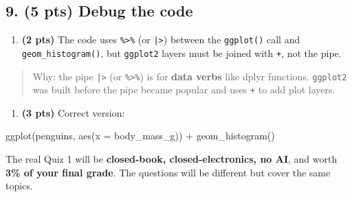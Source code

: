 \documentclass[
  11pt,
  letterpaper,
  DIV=11,
  numbers=noendperiod]{scrartcl}
\newenvironment{Shaded}{\begin{snugshade}}{\end{snugshade}}
\newcommand{\AttributeTok}[1]{\textcolor[rgb]{0.40,0.45,0.13}{#1}}
\newcommand{\FunctionTok}[1]{\textcolor[rgb]{0.28,0.35,0.67}{#1}}
\newcommand{\NormalTok}[1]{\textcolor[rgb]{0.00,0.23,0.31}{#1}}
\newcommand{\SpecialCharTok}[1]{\textcolor[rgb]{0.37,0.37,0.37}{#1}}
\providecommand{\tightlist}{%
  \setlength{\itemsep}{0pt}\setlength{\parskip}{0pt}}
\begin{document}
\hrulefill

\subsection{9. (5 pts) Debug the code}

\begin{enumerate}
\def\labelenumi{(\alph{enumi})}
\tightlist
\item \textbf{(2 pts)} The code uses \texttt{\%\textgreater{}\%} (or \texttt{|\textgreater{}}) between the \texttt{ggplot()} call and \texttt{geom\_histogram()}, but \texttt{ggplot2} layers must be joined with \texttt{+}, not the pipe.
\end{enumerate}

\begin{quote}
Why: the pipe \texttt{|\textgreater{}} (or \texttt{\%\textgreater{}\%}) is for \textbf{data verbs} like dplyr functions. \texttt{ggplot2} was built before the pipe became popular and uses \texttt{+} to add plot layers.
\end{quote}

\begin{enumerate}
\def\labelenumi{(\alph{enumi})}
\setcounter{enumi}{1}
\tightlist
\item \textbf{(3 pts)} Correct version:
\end{enumerate}

\begin{Shaded}
\begin{Highlighting}[]
\FunctionTok{ggplot}\NormalTok{(penguins, }\FunctionTok{aes}\NormalTok{(}\AttributeTok{x =}\NormalTok{ body\_mass\_g)) }\SpecialCharTok{+}
  \FunctionTok{geom\_histogram}\NormalTok{()}
\end{Highlighting}
\end{Shaded}

\vspace{0.5em}

\begin{tcolorbox}[enhanced jigsaw, arc=.35mm, bottomrule=.15mm, bottomtitle=1mm, breakable, colback=white, colbacktitle=quarto-callout-note-color!10!white, colframe=quarto-callout-note-color-frame, coltitle=black, left=2mm, leftrule=.75mm, opacityback=0, opacitybacktitle=0.6, rightrule=.15mm, title=\textcolor{quarto-callout-note-color}{\faInfo}\hspace{0.5em}{Reminder}, titlerule=0mm, toprule=.15mm, toptitle=1mm]

The real Quiz 1 will be \textbf{closed-book, closed-electronics, no AI}, and worth \textbf{3\% of your final grade}. The questions will be different but cover the same topics.

\end{tcolorbox}
\end{document}
